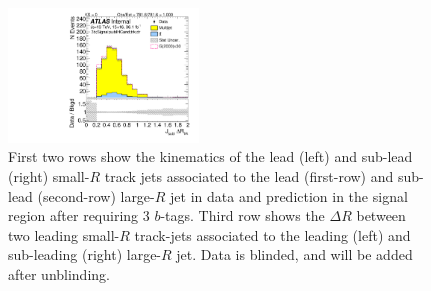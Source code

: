 \begin{figure}[htbp!]
\begin{center}
\includegraphics[width=0.45\textwidth,angle=-90]{figures/boosted/Signal/b77_ThreeTag_Signal_sublHCand_trk_dr_blind.pdf}
  \caption{First two rows show the kinematics of the lead (left) and sub-lead (right) small-$R$ track jets associated to the lead (first-row) and sub-lead (second-row) large-$R$ jet in data and prediction in the signal region after requiring 3 $b$-tags. Third row shows the $\Delta R$ between two leading small-$R$ track-jets associated to the leading (left) and sub-leading (right) large-$R$ jet. Data is blinded, and will be added after unblinding. }
  \label{fig:boosted-3b-signal-blind-ak2}
\end{center}
\end{figure}


